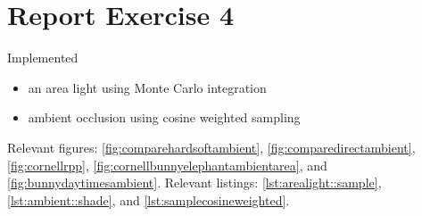 \section{Report Exercise 4}

Implemented
\begin{itemize}
	\item{an area light using Monte Carlo integration}
	\item{ambient occlusion using cosine weighted sampling}
\end{itemize}

Relevant figures: \ref{fig:comparehardsoftambient}, \ref{fig:comparedirectambient}, \ref{fig:cornellrpp}, \ref{fig:cornellbunnyelephantambientarea}, and \ref{fig:bunnydaytimesambient}. Relevant listings: \ref{lst:arealight::sample}, \ref{lst:ambient::shade}, and \ref{lst:samplecosineweighted}.

